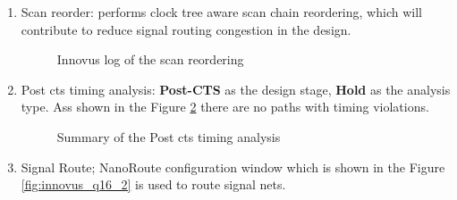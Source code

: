 \documentclass[a4paper,11pt]{article}%
\begin{document}
\begin{enumerate}[1.)]
	
	\item Scan reorder: performs clock tree aware scan chain reordering, which will contribute to reduce signal routing congestion in the design.
	\begin{figure}[H]
		\centering
		\caption{Innovus log of the scan reordering}
		\label{fig:scanReorder}
	\end{figure}
	
	\item Post \ac{cts} timing analysis: \textbf{Post-CTS} as the design stage,  \textbf{Hold} as the analysis type. Ass shown in the Figure \ref{fig:postCTStimeDesign} there are no paths with timing violations.
	\begin{figure}[H]
		\centering
		\caption{Summary of the Post \ac{cts} timing analysis}
		\label{fig:postCTStimeDesign}
	\end{figure}
	
	\item Signal Route; NanoRoute configuration window which is shown in the Figure \ref*{fig:innovus_q16_2} is used to route signal nets.
	

\end{enumerate}
\end{document}
